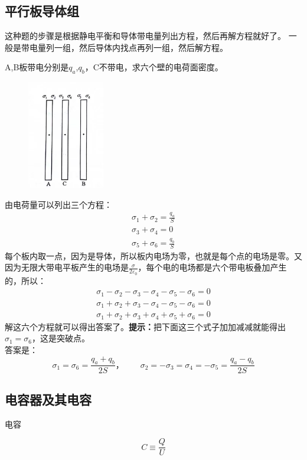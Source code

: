 \documentclass[cn,hazy,blue,14pt,normal]{elegantnote}
\numberwithin{equation}{section}
\begin{document}
\subsection{平行板导体组}
这种题的步骤是根据静电平衡和导体带电量列出方程，然后再解方程就好了。
一般是带电量列一组，然后导体内找点再列一组，然后解方程。
\begin{example}
	A,B板带电分别是$q_a$,$q_b$，C不带电，求六个壁的电荷面密度。
\end{example}
\begin{figure}
		\includegraphics[width=0.3\textwidth ]{image/平行板导体组.jpg}
\end{figure}
由电荷量可以列出三个方程：
\begin{gather*}
	\sigma_1+\sigma_2 = \frac{q_a}{S}\\
	\sigma_3+\sigma_4 = 0\\
	\sigma_5+\sigma_6 = \frac{q_b}{S}
\end{gather*}
每个板内取一点，因为是导体，所以板内电场为零，也就是每个点的电场是零。又因为无限大带电平板产生的电场是$\frac{\sigma}{2\varepsilon_0}$，每个电的电场都是六个带电板叠加产生的，所以：
\begin{gather*}
	\sigma_1 - \sigma_2 - \sigma_3 - \sigma_4 - \sigma_5 - \sigma_6 = 0\\
	\sigma_1 + \sigma_2 + \sigma_3 - \sigma_4 - \sigma_5 - \sigma_6 = 0\\
	\sigma_1 + \sigma_2 + \sigma_3 + \sigma_4 + \sigma_5 + \sigma_6 = 0
\end{gather*}
解这六个方程就可以得出答案了。\textbf{提示：}把下面这三个式子加加减减就能得出$\sigma_1 = \sigma_6$，这是突破点。\\
答案是：
$$
\sigma_1 = \sigma_6 = \frac{q_a+q_b}{2S}，\qquad \sigma_2 = -\sigma_3 = \sigma_4 = -\sigma_5 = \frac{q_a-q_b}{2S}
$$

\subsection{电容器及其电容}
\begin{definition}
	电容
\end{definition}
\begin{equation}
C \equiv \frac{Q}{U}
\end{equation}
\end{document}
